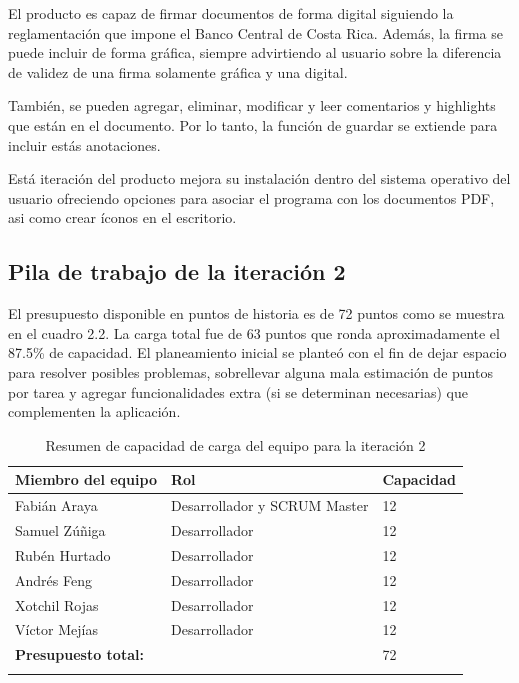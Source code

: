 El producto es capaz de firmar documentos de forma digital siguiendo la reglamentación que impone el Banco Central de Costa Rica. Además, la firma se puede incluir de forma gráfica, siempre advirtiendo al usuario sobre la diferencia de validez de una firma solamente gráfica y una digital.

También, se pueden agregar, eliminar, modificar y leer comentarios y highlights que están en el documento. Por lo tanto, la función de guardar se extiende para incluir estás anotaciones.

Está iteración del producto mejora su instalación dentro del sistema operativo del usuario ofreciendo opciones para asociar el programa con los documentos PDF, asi como crear íconos en el escritorio.

\subsection{Pila de trabajo de la iteración 2}


El presupuesto disponible en puntos de historia es de 72 puntos como se muestra en el cuadro 2.2. La carga total fue de 63 puntos que ronda aproximadamente el 87.5\% de capacidad. El planeamiento inicial se planteó con el fin de dejar espacio para resolver posibles problemas, sobrellevar alguna mala estimación de puntos por tarea y agregar funcionalidades extra (si se determinan necesarias) que complementen la aplicación. 

\begin{longtable}{|l|l|l|}
    \hline
    \textbf{Miembro del equipo} & \textbf{Rol} & \textbf{Capacidad} \\
    \hline
    Fabián Araya & Desarrollador y SCRUM Master & 12 \\
    Samuel Zúñiga & Desarrollador & 12 \\
    Rubén Hurtado & Desarrollador & 12\\
    Andrés Feng & Desarrollador & 12\\
    Xotchil Rojas & Desarrollador & 12\\
    Víctor Mejías & Desarrollador & 12 \\
    \hline \hline
    \textbf{Presupuesto total:} &  & 72\\
    \hline
    \caption{Resumen de capacidad de carga del equipo para la iteración 2}
\end{longtable}


